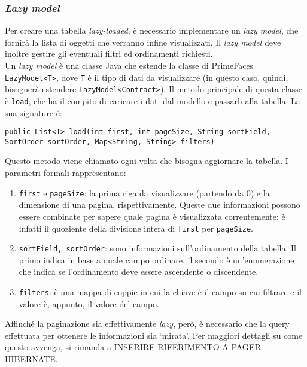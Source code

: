 \subsubsection{\textit{Lazy model}}
Per creare una tabella \textit{lazy-loaded}, è necessario implementare un \textit{lazy model}, che fornirà la lista di oggetti che verranno infine visualizzati. Il \textit{lazy model} deve inoltre gestire gli eventuali filtri ed ordinamenti richiesti.\\
Un \textit{lazy model} è una classe Java che estende la classe di PrimeFaces \lstinline{LazyModel<T>}, dove \texttt{T} è il tipo di dati da visualizzare (in questo caso, quindi, bisognerà estendere \lstinline{LazyModel<Contract>}). Il metodo principale di questa classe è \lstinline{load}, che ha il compito di caricare i dati dal modello e passarli alla tabella. La sua signature è:

\begin{lstlisting}
public List<T> load(int first, int pageSize, String sortField, SortOrder sortOrder, Map<String, String> filters)
\end{lstlisting}

Questo metodo viene chiamato ogni volta che bisogna aggiornare la tabella. I parametri formali rappresentano:

\begin{enumerate}
\item \texttt{first} e \texttt{pageSize}: la prima riga da visualizzare (partendo da 0) e la dimensione di una pagina, rispettivamente. Queste due informazioni possono essere combinate per sapere quale pagina è visualizzata correntemente: è infatti il quoziente della divisione intera di \texttt{first} per \texttt{pageSize}.
\item \texttt{sortField, sortOrder}: sono informazioni sull'ordinamento della tabella. Il primo indica in base a quale campo ordinare, il secondo è un'enumerazione che indica se l'ordinamento deve essere ascendente o discendente.
\item \texttt{filters}: è una mappa di coppie in cui la chiave è il campo su cui filtrare e il valore è, appunto, il valore del campo.
\end{enumerate}

Affinché la paginazione sia effettivamente \textit{lazy}, però, è necessario che la query effettuata per ottenere le informazioni sia \textquoteleft mirata\textquoteright{}. Per maggiori dettagli su come questo avvenga, si rimanda a INSERIRE RIFERIMENTO A PAGER HIBERNATE.

